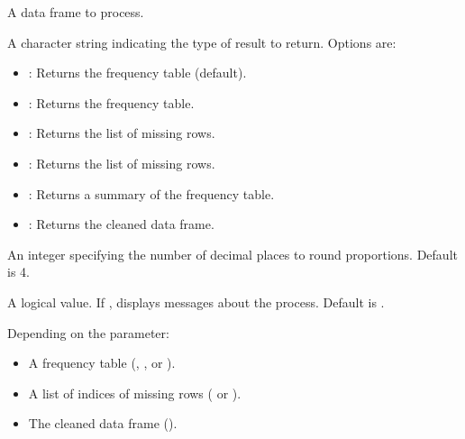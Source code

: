 \documentclass[a4paper]{book}
\begin{document}
\begin{Arguments}
\begin{ldescription}
\item[\code{df}] A data frame to process.

\item[\code{type}] A character string indicating the type of result to return. Options are:
\begin{itemize}

\item{} : Returns the frequency table (default).
\item{} : Returns the frequency table.
\item{} : Returns the list of missing rows.
\item{} : Returns the list of missing rows.
\item{} : Returns a summary of the frequency table.
\item{} : Returns the cleaned data frame.

\end{itemize}


\item[\code{digits}] An integer specifying the number of decimal places to round proportions. Default is 4.

\item[\code{msg}] A logical value. If , displays messages about the process. Default is .
\end{ldescription}
\end{Arguments}
%
\begin{Value}
Depending on the  parameter:
\begin{itemize}

\item{} A frequency table (, , or ).
\item{} A list of indices of missing rows ( or ).
\item{} The cleaned data frame ().

\end{itemize}

\end{Value}
%
\end{document}
